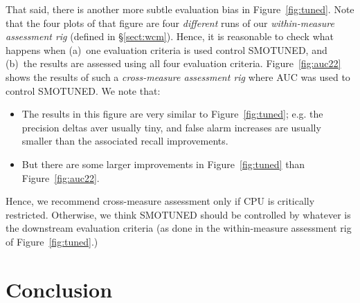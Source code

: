 \documentclass[10pt,conference]{IEEEtran}
\newcommand{\bi}{\begin{itemize}[leftmargin=0.4cm]}
\newcommand{\ei}{\end{itemize}}
\theoremstyle{break}
\theoremstyle{break}
\newcommand{\tion}[1]{{\S}\ref{sect:#1}}
\newcommand{\smb}{{\sc SMOTUNED}}
\begin{document}
That said, there is another more subtle evaluation bias in  Figure~\ref{fig:tuned}. Note that the four plots of that figure are four {\em different} runs of our  {\em within-measure assessment rig}
(defined in \tion{wcm}). Hence, it is reasonable to check what happens when (a)~one
evaluation criteria is used control {\smb}, and (b)~the results are assessed
using all four evaluation criteria. 
Figure~\ref{fig:auc22} shows the results of such a {\em cross-measure assessment rig} where AUC was used to control {\smb}. We note that:
\bi
\item
The results in this figure are very similar to   Figure~\ref{fig:tuned}; e.g. the precision deltas aver usually tiny, and false alarm increases are usually smaller than the associated recall improvements. 
\item
But there are some larger improvements in Figure~\ref{fig:tuned}
than Figure~\ref{fig:auc22}.
\ei
Hence, we recommend cross-measure assessment only if CPU is critically restricted. Otherwise, we think {\smb} should be controlled by whatever is the downstream evaluation criteria
(as done in the within-measure assessment rig of Figure~\ref{fig:tuned}.)




\section{Conclusion}
\label{sect:conclusion}





\end{document}
